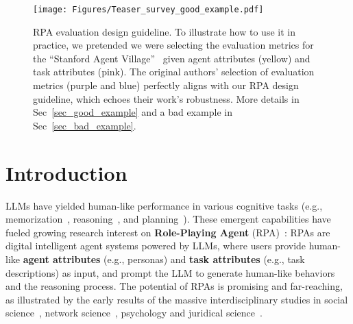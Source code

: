 
\begin{figure}[t]
    \centering
    \texttt{[image: Figures/Teaser\_survey\_good\_example.pdf]}
    \vspace{-0.5em}
    \caption{RPA evaluation design guideline. To illustrate how to use it in practice, we pretended we were selecting the evaluation metrics for the  ``Stanford Agent Village''~\cite{park2023generative} given agent attributes (yellow) and task attributes (pink). The original authors' selection of evaluation metrics (purple and blue) perfectly aligns with our RPA design guideline, which echoes their work's robustness. More details in Sec~\ref{sec_good_example} and a bad example in Sec~\ref{sec_bad_example}.}
    \vspace{-1.5em}
    \label{fig:teaser}
\end{figure}


\section{Introduction}
LLMs have yielded human-like performance in various cognitive tasks (e.g., memorization~\cite{schwarzschild2025rethinking}, reasoning~\cite{wang2023can, plaat2024reasoning}, and planning~\cite{song2023llm, huang2024understanding}). 
These emergent capabilities have fueled growing research interest on 
\textbf{Role-Playing Agent} (RPA)~\cite{chen2024from,tseng-etal-2024-two}:
RPAs are digital intelligent agent systems powered by LLMs, where users provide human-like \textbf{agent attributes} (e.g., personas) and \textbf{task attributes} (e.g., task descriptions) as input, and prompt the LLM to generate human-like behaviors and the reasoning process. 
The potential of RPAs is promising and far-reaching, as illustrated by the early results of the massive interdisciplinary studies in social science~\cite{10.1145/3526113.3545616, park2023generative}, network science~\cite{10.1145/3613904.3642363}, psychology\cite{jiang-etal-2024-personallm} and juridical science~\cite{he-etal-2024-agentscourt}.




